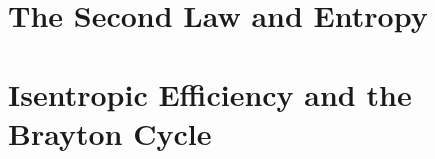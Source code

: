 \chapter{The Second Law and Entropy} \label{ch:second_law}


\chapter{Isentropic Efficiency and the Brayton Cycle} \label{ch:brayton}


%


\appendix

\backmatter
